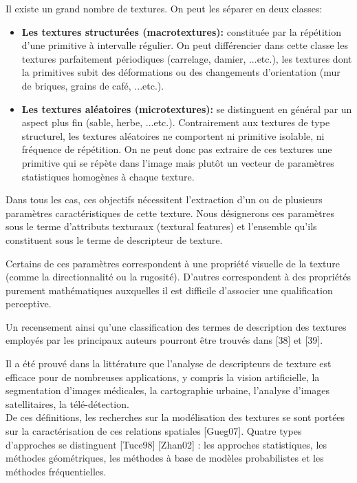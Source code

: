Il existe un grand nombre de textures. On peut les séparer en deux classes:
\begin{itemize}
	\item \textbf{Les textures structurées (macrotextures):} constituée par la répétition d’une primitive à intervalle régulier. On peut différencier dans cette classe les textures parfaitement périodiques (carrelage, damier, ...etc.), les textures dont la primitives subit des déformations ou des changements d'orientation (mur de briques, grains de café, ...etc.).
	
	\item \textbf{Les textures aléatoires (microtextures):} se distinguent en général par un aspect plus fin (sable, herbe, ...etc.). Contrairement aux textures de type structurel, les textures aléatoires ne comportent ni primitive isolable, ni fréquence de répétition. On ne peut donc pas extraire de ces textures une primitive qui se répète dans l’image mais plutôt un vecteur de paramètres statistiques homogènes à chaque texture.
\end{itemize}

Dans tous les cas, ces objectifs nécessitent l'extraction d'un ou de plusieurs paramètres caractéristiques de cette texture. Nous désignerons ces paramètres sous le terme d’attributs texturaux (textural features) et l’ensemble qu’ils constituent sous le terme de descripteur de texture.

Certains de ces paramètres correspondent à une propriété visuelle de la texture (comme la directionnalité ou la rugosité). D'autres correspondent à des propriétés purement mathématiques auxquelles il est difficile d'associer une qualification perceptive.

Un recensement ainsi qu'une classification des termes de description des textures employés par les principaux auteurs pourront être trouvés dans [38] et [39].

Il a été prouvé dans la littérature que l'analyse de descripteurs de texture est efficace pour de nombreuses applications, y compris la vision artificielle, la segmentation d'images médicales, la cartographie urbaine, l'analyse d'images satellitaires, la télé-détection.\\


De ces définitions, les recherches sur la modélisation des textures se sont portées sur la caractérisation de ces relations spatiales [Gueg07]. Quatre types d’approches se distinguent [Tuce98] [Zhan02] : 
les approches statistiques, les méthodes géométriques, les méthodes à base de modèles probabilistes et les méthodes fréquentielles.\\ 

